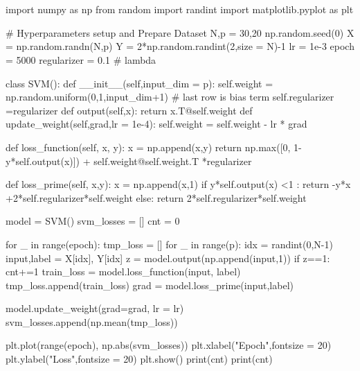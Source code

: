 \documentclass[10pt]{article}
\begin{document}
\section{}
\begin{python}
import numpy as np
from random import randint
import matplotlib.pyplot as plt

# Hyperparameters setup and Prepare Dataset
N,p = 30,20
np.random.seed(0)
X = np.random.randn(N,p)
Y = 2*np.random.randint(2,size = N)-1
lr = 1e-3
epoch = 5000
regularizer = 0.1 # lambda

class SVM():
    def __init__(self,input_dim = p):
        self.weight = np.random.uniform(0,1,input_dim+1) # last row is bias term
        self.regularizer =regularizer
    def output(self,x):
        return x.T@self.weight
    def update_weight(self,grad,lr = 1e-4):
        self.weight = self.weight - lr * grad

    def loss_function(self, x, y):
        x = np.append(x,y)
        return np.max([0, 1-y*self.output(x)]) + self.weight@self.weight.T *regularizer
    
    def loss_prime(self, x,y):
        x = np.append(x,1)
        if y*self.output(x) <1 : 
            return -y*x +2*self.regularizer*self.weight
        else:
            return 2*self.regularizer*self.weight

model = SVM()
svm_losses = []
cnt = 0

for _ in range(epoch):
    tmp_loss = []
    for _ in range(p):
        idx = randint(0,N-1)
        input,label = X[idx], Y[idx]
        z = model.output(np.append(input,1))
        if z==1:
            cnt+=1
        train_loss = model.loss_function(input, label)
        tmp_loss.append(train_loss)
        grad = model.loss_prime(input,label)
        
        model.update_weight(grad=grad, lr = lr)
    svm_losses.append(np.mean(tmp_loss))

plt.plot(range(epoch), np.abs(svm_losses))
plt.xlabel("Epoch",fontsize = 20)
plt.ylabel("Loss",fontsize = 20)
plt.show()
print(cnt)
print(cnt)
\end{python}
\end{document}
